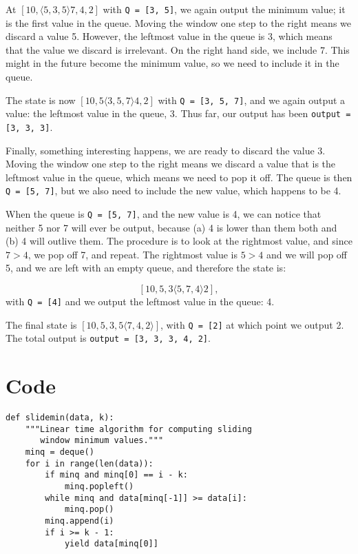 \documentclass[a4paper,12pt]{article}
\begin{document}
At $[10, \langle 5, 3, 5 \rangle 7, 4, 2]$ with
%
\texttt{Q = [3, 5]},
%
we again output the minimum value; it is the first value in the queue.
%
Moving the window one step to the right means we discard a value 5.  However,
the leftmost value in the queue is 3, which means that the value we discard is
irrelevant.  On the right hand side, we include 7.  This might in the future
become the minimum value, so we need to include it in the queue.

The state is now $[10, 5 \langle 3, 5, 7 \rangle 4, 2]$ with
%
\texttt{Q = [3, 5, 7]}, and we again output a value: the leftmost
value in the queue, 3.  Thus far, our output has been
%
\texttt{output = [3, 3, 3]}.

Finally, something interesting happens, we are ready to discard the value 3.
Moving the window one step to the right means we discard a value that is the
leftmost value in the queue, which means we need to pop it off.  The queue is
then
%
\texttt{Q = [5, 7]},
%
but we also need to include the new value, which happens to be 4.

When the queue is \texttt{Q = [5, 7]}, and the new value is 4, we
can notice that neither 5 nor 7 will ever be output, because (a) 4 is lower
than them both and (b) 4 will outlive them.  The procedure is to look at the
rightmost value, and since $7 > 4$, we pop off 7, and repeat.  The rightmost
value is $5 > 4$ and we will pop off 5, and we are left with an empty queue,
and therefore the state is:

$$[10, 5 ,3 \langle 5, 7, 4 \rangle  2],$$
with
%
\texttt{Q = [4]}
%
and we output the leftmost value in the queue: 4.

The final state is $[10, 5 ,3 ,5 \langle 7, 4 , 2 \rangle]$, with
%
\texttt{Q = [2]}
%
at which point we output 2.  The total output is
%
\texttt{output = [3, 3, 3, 4, 2]}.
%

\appendix
\section*{Code}

\begin{verbatim}
def slidemin(data, k):
    """Linear time algorithm for computing sliding
       window minimum values."""
    minq = deque()
    for i in range(len(data)):
        if minq and minq[0] == i - k:
            minq.popleft()
        while minq and data[minq[-1]] >= data[i]:
            minq.pop()
        minq.append(i)
        if i >= k - 1:
            yield data[minq[0]]
\end{verbatim}
\end{document}
